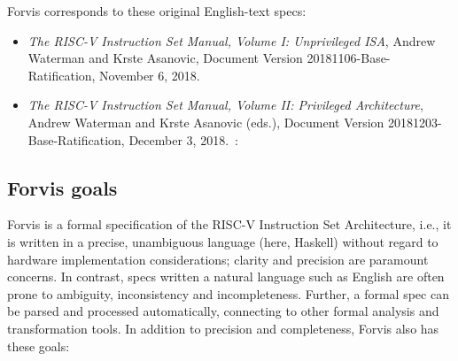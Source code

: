 \documentclass[11pt]{article}
\begin{document}
Forvis corresponds to these original English-text specs:
\begin{itemize}

\item {\it The RISC-V Instruction Set Manual, Volume I: Unprivileged ISA},
    Andrew Waterman and Krste Asanovic,
    Document Version 20181106-Base-Ratification,
    November 6, 2018.~\cite{Waterman2018_user}

\item {\it The RISC-V Instruction Set Manual, Volume II: Privileged
    Architecture}, 
    Andrew Waterman and Krste Asanovic (eds.),
    Document Version 20181203-Base-Ratification,
    December 3, 2018.~\cite{Waterman2018_priv}:

\end{itemize}


\subsection{Forvis goals}

Forvis is a formal specification of the RISC-V Instruction Set
Architecture, i.e., it is written in a precise, unambiguous language
(here, Haskell) without regard to hardware implementation
considerations; clarity and precision are paramount concerns.  In
contrast, specs written a natural language such as English are often
prone to ambiguity, inconsistency and incompleteness.  Further, a
formal spec can be parsed and processed automatically, connecting to
other formal analysis and transformation tools.  In addition to
precision and completeness, Forvis also has these goals:
\end{document}
